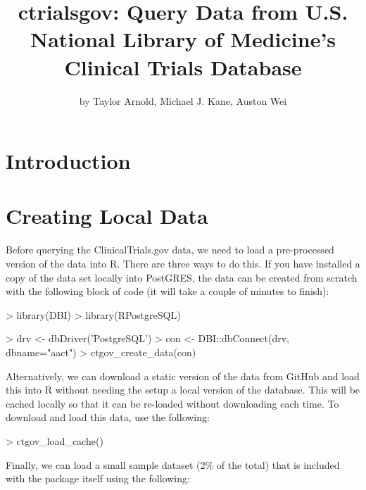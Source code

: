 \title{ctrialsgov: Query Data from U.S. National Library of Medicine's Clinical Trials Database}
\author{by Taylor Arnold, Michael J. Kane, Auston Wei}

\maketitle


\section{Introduction}


\section{Creating Local Data}

Before querying the ClinicalTrials.gov data, we need to load a pre-processed
version of the data into R. There are three ways to do this. If you have
installed a copy of the data set locally into PostGRES, the data can be
created from scratch with the following block of code (it will take a couple
of minutes to finish):

\begin{example}
> library(DBI)
> library(RPostgreSQL)

> drv <- dbDriver('PostgreSQL')
> con <- DBI::dbConnect(drv, dbname="aact")
> ctgov_create_data(con)
\end{example}

Alternatively, we can download a static version of the data from GitHub and
load this into R without needing the setup a local version of the database.
This will be cached locally so that it can be re-loaded without downloading
each time. To download and load this data, use the following:

\begin{example}
> ctgov_load_cache()
\end{example}

Finally, we can load a small sample dataset (2\% of the total) that is included
with the package itself using the following:

